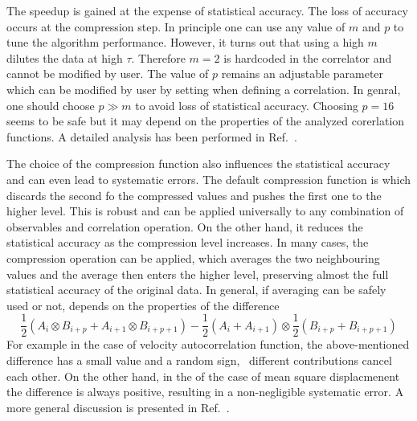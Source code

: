 The speedup is gained at the expense of statistical accuracy.
The loss of accuracy occurs at the compression step.
In principle one can use any value of $m$ and $p$ to tune the algorithm
performance. However, it turns out that using a high $m$ dilutes the
data at high $\tau$. Therefore $m=2$ is hardcoded in the \es correlator
and cannot be modified by user. The value of $p$ remains an adjustable
parameter which can be modified by user by setting 
when defining a correlation. In genral, one should choose $p \gg m$
to avoid loss of statistical accuracy. Choosing $p=16$ seems to be
safe but it may depend on the properties of the analyzed
corerlation functions. A detailed analysis has been performed
in Ref.~\cite{ramirez10a}.

The choice of the compression function also influences the statistical
accuracy and can even lead to systematic errors. The default compression 
function is  which discards the second fo the compressed 
values and pushes the first one to the higher level. This is robust and 
can be applied universally to any combination of observables and
correlation operation. On the other hand, it reduces the
statistical accuracy as the compression level increases.
In many cases, the  compression operation
can be applied, which averages the two neighbouring values
and the average then enters the higher level, preserving
almost the full statistical accuracy of the original data. 
In general, if averaging can be safely used or not, depends on the 
properties of the difference
\begin{equation} 
\frac{1}{2} (A_i \otimes B_{i+p} + A_{i+1} \otimes B_{i+p+1} ) - 
\frac{1}{2} (A_i + A_{i+1} ) \otimes \frac{1}{2} (B_{i+p} +  B_{i+p+1})
\label{eq:difference}
\end{equation} 
For example in the case of velocity autocorrelation function, the
above-mentioned difference has a small value and a random sign, \ie\ 
different contributions cancel each other. On the other hand, in the
of the case of mean square displacmenent the difference is always positive,
resulting in a non-negligible systematic error. A more general
discussion is presented in Ref.~\cite{ramirez10a}.
